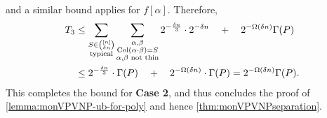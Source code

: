 and a similar bound applies for $f[\alpha]$. Therefore,
\begin{align*}
  T_3 & \leq \sum_{\substack{S \in \binom{[n]}{\delta n}\\\text{typical}}} \sum_{\substack{\alpha, \beta\\ \operatorname{Col}(\alpha \cdot \beta) = S \\ \text{$\alpha$,$\beta$ not thin}}} 2^{-\frac{\delta n}{3}}\cdot 2^{-\delta n} \quad+\quad 2^{-\Omega(\delta n)} \Gamma(P)\\
  & \leq 2^{-\frac{\delta n}{3}} \cdot \Gamma(P) \quad + \quad 2^{-\Omega(\delta n)}\cdot \Gamma(P) = 2^{-\Omega(\delta n)} \Gamma(P).
\end{align*}
This completes the bound for {\bf Case 2}, and thus concludes the proof of \autoref{lemma:monVPVNP-ub-for-poly} and hence \autoref{thm:monVPVNPseparation}.


